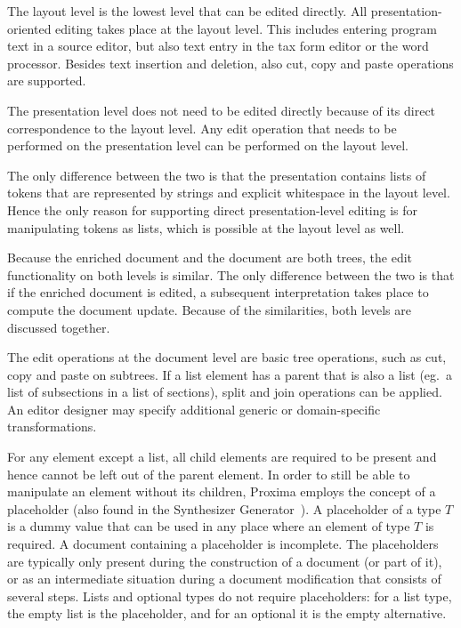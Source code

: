 \documentclass{speauth}
\begin{document}

The layout level is the lowest level that can be edited directly. All presentation-oriented editing takes place at the layout level. This includes entering program text in a source editor, but also text entry in the tax form editor or the word processor. Besides text insertion and deletion, also cut, copy and paste operations are supported.


The presentation level does not need to be edited directly because of its direct correspondence to the layout level. Any edit operation that needs to be performed on the presentation level can be performed on the layout level.

\bc The only difference between the two is that the presentation contains lists of tokens that are represented by strings and explicit whitespace in the layout level. Hence the only reason for supporting direct presentation-level editing is for manipulating tokens as lists, which is possible at the layout level as well. \ec


Because the enriched document and the document are both trees, the edit functionality on both levels is similar. The only difference between the two is that if the enriched document is edited, a subsequent interpretation takes place to compute the document update. Because of the similarities, both levels are discussed together.

The edit operations at the document level are basic tree operations, such as cut, copy and paste on subtrees. If a list element has a parent that is also a list (eg.\ a list of subsections in a list of sections), split and join operations can be applied. An editor designer may specify additional generic or domain-specific transformations.

For any element except a list, all child elements are required to be present and hence cannot be left out of the parent element. In order to still be able to manipulate an element without its children, Proxima employs the concept of a placeholder (also found in the Synthesizer Generator~\cite{reps84synGen}). A placeholder of a type $T$ is a dummy value that can be used in any place where an element of type $T$ is required. A document containing a placeholder is incomplete. The placeholders are typically only present during the construction of a document (or part of it), or as an intermediate situation during a document modification that consists of several steps. Lists and optional types do not require placeholders: for a list type, the empty list is the placeholder, and for an optional it is the empty alternative.
\end{document}
